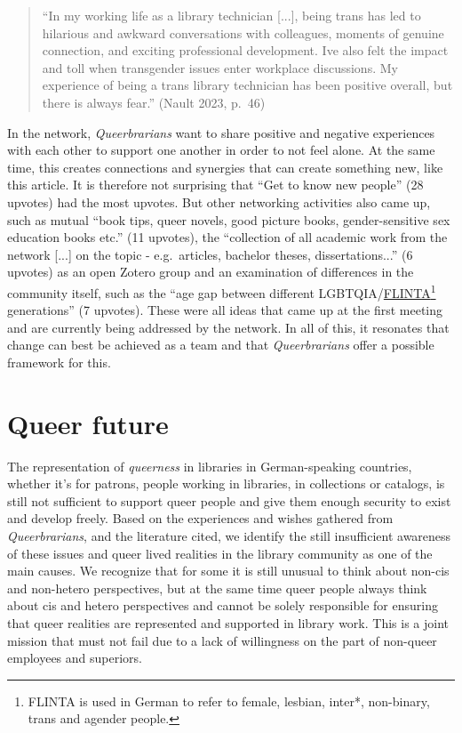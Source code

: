 \documentclass[a4paper,
fontsize=11pt,
oneside,
numbers=noperiodatend,
parskip=half-,
bibliography=totoc,
final
]{scrartcl}
\begin{document}
\begin{quote}
\enquote{In my working life as a library technician {[}...{]}, being trans has
led to hilarious and awkward conversations with colleagues, moments of
genuine connection, and exciting professional development.
I\textquotesingle ve also felt the impact and toll when transgender
issues enter workplace discussions. My experience of being a trans
library technician has been positive overall, but there is always fear.}
(Nault 2023, p.~46)
\end{quote}

In the network, \emph{Queerbrarians} want to share positive and negative
experiences with each other to support one another in order to not feel
alone. At the same time, this creates connections and synergies that can
create something new, like this article. It is therefore not surprising
that \enquote{Get to know new people} (28 upvotes) had the most upvotes. But
other networking activities also came up, such as mutual \enquote{book tips,
queer novels, good picture books, gender-sensitive sex education books
etc.} (11 upvotes), the \enquote{collection of all academic work from the
network {[}...{]} on the topic - e.g.~articles, bachelor theses,
dissertations...} (6 upvotes) as an open Zotero group and an examination
of differences in the community itself, such as the \enquote{age gap between
different
LGBTQIA/\href{https://en.wikipedia.org/wiki/FLINTA*}{FLINTA}\footnote{FLINTA
  is used in German to refer to female, lesbian, inter*, non-binary,
  trans and agender people.} generations} (7 upvotes). These were all
ideas that came up at the first meeting and are currently being
addressed by the network. In all of this, it resonates that change can
best be achieved as a team and that \emph{Queerbrarians} offer a
possible framework for this.

\hypertarget{queer-future}{%
\section{Queer future}\label{queer-future}}

The representation of \emph{queerness} in libraries in German-speaking
countries, whether it's for patrons, people working in libraries, in
collections or catalogs, is still not sufficient to support queer people
and give them enough security to exist and develop freely. Based on the
experiences and wishes gathered from \emph{Queerbrarians}, and the
literature cited, we identify the still insufficient awareness of these
issues and queer lived realities in the library community as one of the
main causes. We recognize that for some it is still unusual to think
about non-cis and non-hetero perspectives, but at the same time queer
people always think about cis and hetero perspectives and cannot be
solely responsible for ensuring that queer realities are represented and
supported in library work. This is a joint mission that must not fail
due to a lack of willingness on the part of non-queer employees and
superiors.
\end{document}
